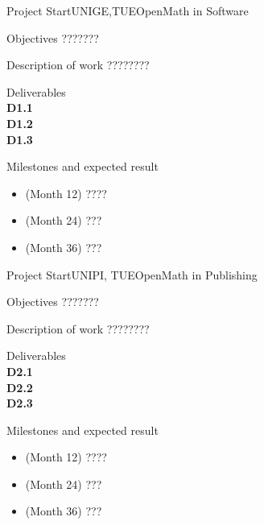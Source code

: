 \documentclass{euproposal}
\begin{document}
\begin{workpackage}{36}{1}{Project Start}{UNIGE,TUE}{OpenMath in Software}
\begin{wpbox}{Objectives}
???????
\end{wpbox}
\begin{wpbox}{Description of work}
  ????????
\end{wpbox}
\begin{wpbox}{Deliverables\\}
{\bf D1.1} \\
{\bf D1.2} \\
{\bf D1.3} 
\end{wpbox}
\begin{wpbox}{Milestones and expected result}
\begin{itemize}
\item (Month 12) ????
\item (Month 24) ???
\item (Month 36) ???
\end{itemize}
\end{wpbox}
\end{workpackage}
\newpage
\begin{workpackage}{36}{2}{Project Start}{UNIPI, TUE}{OpenMath in Publishing}
\begin{wpbox}{Objectives}
???????
\end{wpbox}
\begin{wpbox}{Description of work}
  ????????
\end{wpbox}
\begin{wpbox}{Deliverables\\}
{\bf D2.1} \\
{\bf D2.2} \\
{\bf D2.3} 
\end{wpbox}
\begin{wpbox}{Milestones and expected result}
\begin{itemize}
\item (Month 12) ????
\item (Month 24) ???
\item (Month 36) ???
\end{itemize}
\end{wpbox}
\end{workpackage}
\newpage
\end{document}
